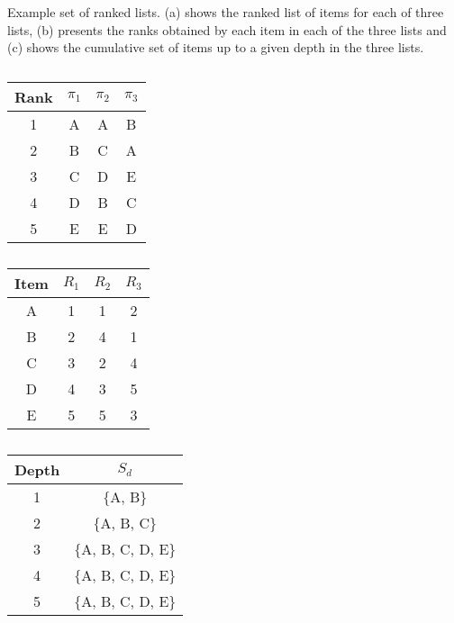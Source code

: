 \documentclass[12pt,a4paper]{article}\usepackage[]{graphicx}\usepackage[]{color}
\begin{document}
\begin{table}[tb]
  \caption{Example set of ranked lists. (a) shows the ranked list of items for each of three lists, (b) presents the ranks obtained by each item in each of the three lists and (c) shows the cumulative set of items up to a given depth in the three lists.}
\begin{center}
  \begin{subtable}{4cm}%
    \caption{}
      \begin{tabular}{cccc}
        \hline\hline %
        Rank & $\pi_1$ & $\pi_2$ & $\pi_3$ \\ \hline
        1 & A & A & B \\
        2 & B & C & A \\
        3 & C & D & E \\
        4 & D & B & C \\
        5 & E & E & D \\ \hline
    \end{tabular}
  \end{subtable}
\hspace{1em}
  \begin{subtable}{4cm}%
    \caption{}
    \begin{tabular}{cccc} \hline\hline
    Item & $R_1$ & $R_2$ & $R_3$ \\ \hline
    A & 1 & 1 & 2 \\
    B & 2 & 4 & 1 \\
    C & 3 & 2 & 4 \\
    D & 4 & 3 & 5 \\
    E & 5 & 5 & 3 \\ \hline
  \end{tabular}
\end{subtable}
\hspace{1em}
\begin{subtable}{4cm}%
  \caption{}
\begin{tabular}{cc} \hline\hline
Depth  &  $S_d$ \\ \hline
1 & $\{$A, B$\}$\\
2 & $\{$A, B, C$\}$ \\
3 & $\{$A, B, C, D, E$\}$ \\
4 & $\{$A, B, C, D, E$\}$ \\
5 & $\{$A, B, C, D, E$\}$ \\ \hline
\end{tabular}
\end{subtable}
\end{center}
\label{tab:example}
\end{table}
\end{document}
